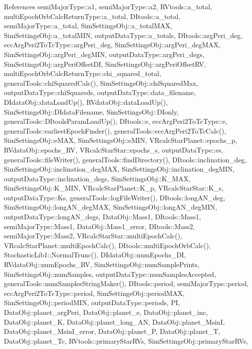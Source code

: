 References semi\-Major\-Type\-::a1, semi\-Major\-Type\-::a2, R\-Vtools\-::a\-\_\-total, multi\-Epoch\-Orb\-Calc\-Return\-Type\-::a\-\_\-total, D\-Itools\-::a\-\_\-total, semi\-Major\-Type\-::a\-\_\-total, Sim\-Settings\-Obj\-::a\-\_\-total\-M\-A\-X, Sim\-Settings\-Obj\-::a\-\_\-total\-M\-I\-N, output\-Data\-Type\-::a\-\_\-totals, D\-Itools\-::arg\-Peri\-\_\-deg, ecc\-Arg\-Peri2\-To\-Tc\-Type\-::arg\-Peri\-\_\-deg, Sim\-Settings\-Obj\-::arg\-Peri\-\_\-deg\-M\-A\-X, Sim\-Settings\-Obj\-::arg\-Peri\-\_\-deg\-M\-I\-N, output\-Data\-Type\-::arg\-Peri\-\_\-degs, Sim\-Settings\-Obj\-::arg\-Peri\-Offset\-D\-I, Sim\-Settings\-Obj\-::arg\-Peri\-Offset\-R\-V, multi\-Epoch\-Orb\-Calc\-Return\-Type\-::chi\-\_\-squared\-\_\-total, general\-Tools\-::chi\-Squared\-Calc(), Sim\-Settings\-Obj\-::chi\-Squared\-Max, output\-Data\-Type\-::chi\-Squareds, output\-Data\-Type\-::data\-\_\-filename, D\-Idata\-Obj\-::data\-Load\-Up(), R\-Vdata\-Obj\-::data\-Load\-Up(), Sim\-Settings\-Obj\-::\-D\-Idata\-Filename, Sim\-Settings\-Obj\-::\-D\-Ionly, general\-Tools\-::\-D\-Itools\-Param\-Load\-Up(), D\-Itools\-::e, ecc\-Arg\-Peri2\-To\-Tc\-Type\-::e, general\-Tools\-::earliest\-Epoch\-Finder(), general\-Tools\-::ecc\-Arg\-Peri2\-To\-Tc\-Calc(), Sim\-Settings\-Obj\-::e\-M\-A\-X, Sim\-Settings\-Obj\-::e\-M\-I\-N, V\-Rcalc\-Star\-Planet\-::epochs\-\_\-p, R\-Vdata\-Obj\-::epochs\-\_\-\-R\-V, V\-Rcalc\-Star\-Star\-::epochs\-\_\-s, output\-Data\-Type\-::es, general\-Tools\-::file\-Writer(), general\-Tools\-::find\-Directory(), D\-Itools\-::inclination\-\_\-deg, Sim\-Settings\-Obj\-::inclination\-\_\-deg\-M\-A\-X, Sim\-Settings\-Obj\-::inclination\-\_\-deg\-M\-I\-N, output\-Data\-Type\-::inclination\-\_\-degs, Sim\-Settings\-Obj\-::\-K\-\_\-\-M\-A\-X, Sim\-Settings\-Obj\-::\-K\-\_\-\-M\-I\-N, V\-Rcalc\-Star\-Planet\-::\-K\-\_\-p, V\-Rcalc\-Star\-Star\-::\-K\-\_\-s, output\-Data\-Type\-::\-Ks, general\-Tools\-::log\-File\-Writer(), D\-Itools\-::long\-A\-N\-\_\-deg, Sim\-Settings\-Obj\-::long\-A\-N\-\_\-deg\-M\-A\-X, Sim\-Settings\-Obj\-::long\-A\-N\-\_\-deg\-M\-I\-N, output\-Data\-Type\-::long\-A\-N\-\_\-degs, Data\-Obj\-::\-Mass1, D\-Itools\-::\-Mass1, semi\-Major\-Type\-::\-Mass1, Data\-Obj\-::\-Mass1\-\_\-error, D\-Itools\-::\-Mass2, semi\-Major\-Type\-::\-Mass2, V\-Rcalc\-Star\-Star\-::multi\-Epoch\-Calc(), V\-Rcalc\-Star\-Planet\-::multi\-Epoch\-Calc(), D\-Itools\-::multi\-Epoch\-Orb\-Calc(), Stochastic\-Lib1\-::\-Normal\-Trunc(), D\-Idata\-Obj\-::num\-Epochs\-\_\-\-D\-I, R\-Vdata\-Obj\-::num\-Epochs\-\_\-\-R\-V, Sim\-Settings\-Obj\-::num\-Sample\-Prints, Sim\-Settings\-Obj\-::num\-Samples, output\-Data\-Type\-::num\-Samples\-Accepted, general\-Tools\-::num\-Samples\-String\-Maker(), D\-Itools\-::period, semi\-Major\-Type\-::period, ecc\-Arg\-Peri2\-To\-Tc\-Type\-::period, Sim\-Settings\-Obj\-::period\-M\-A\-X, Sim\-Settings\-Obj\-::period\-M\-I\-N, output\-Data\-Type\-::periods, P\-I, Data\-Obj\-::planet\-\_\-arg\-Peri, Data\-Obj\-::planet\-\_\-e, Data\-Obj\-::planet\-\_\-inc, Data\-Obj\-::planet\-\_\-\-K, Data\-Obj\-::planet\-\_\-long\-\_\-\-A\-N, Data\-Obj\-::planet\-\_\-\-Msin\-I, Data\-Obj\-::planet\-\_\-\-Msin\-I\-\_\-error, Data\-Obj\-::planet\-\_\-\-P, Data\-Obj\-::planet\-\_\-\-T, Data\-Obj\-::planet\-\_\-\-Tc, R\-Vtools\-::primary\-Star\-R\-Vs, Sim\-Settings\-Obj\-::primary\-Star\-R\-Vs, 
